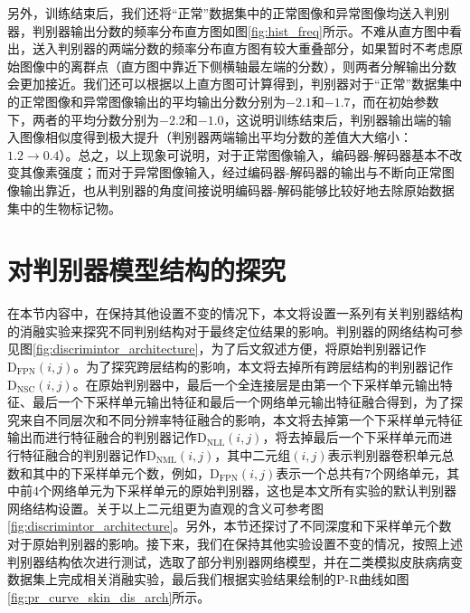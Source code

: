 \noindent 另外，训练结束后，我们还将“正常”数据集中的正常图像和异常图像均送入判别器，判别器输出分数的频率分布直方图如图\ref{fig:hist_freq}所示。不难从直方图中看出，送入判别器的两端分数的频率分布直方图有较大重叠部分，如果暂时不考虑原始图像中的离群点（直方图中靠近下侧横轴最左端的分数），则两者分解输出分数会更加接近。我们还可以根据以上直方图可计算得到，判别器对于“正常”数据集中的正常图像和异常图像输出的平均输出分数分别为$-2.1$和$-1.7$，而在初始参数下，两者的平均分数分别为$-2.2$和$-1.0$，这说明训练结束后，判别器输出端的输入图像相似度得到极大提升（判别器两端输出平均分数的差值大大缩小：$1.2\rightarrow 0.4$）。总之，以上现象可说明，对于正常图像输入，编码器-解码器基本不改变其像素强度；而对于异常图像输入，经过编码器-解码器的输出与不断向正常图像输出靠近，也从判别器的角度间接说明编码器-解码能够比较好地去除原始数据集中的生物标记物。


\section{对判别器模型结构的探究}\label{sec:dis_arch}
在本节内容中，在保持其他设置不变的情况下，本文将设置一系列有关判别器结构的消融实验来探究不同判别结构对于最终定位结果的影响。判别器的网络结构可参见图\ref{fig:discrimintor_architecture}，为了后文叙述方便，将原始判别器记作$\mathrm{D}_\mathrm{FPN}(i,j)$。为了探究跨层结构的影响，本文将去掉所有跨层结构的判别器记作$\mathrm{D}_\mathrm{NSC}(i,j)$。在原始判别器中，最后一个全连接层是由第一个下采样单元输出特征、最后一个下采样单元输出特征和最后一个网络单元输出特征融合得到，为了探究来自不同层次和不同分辨率特征融合的影响，本文将去掉第一个下采样单元特征输出而进行特征融合的判别器记作$\mathrm{D}_\mathrm{NLL}(i,j)$，将去掉最后一个下采样单元而进行特征融合的判别器记作$\mathrm{D}_\mathrm{NML}(i,j)$，其中二元组$(i,j)$表示判别器卷积单元总数和其中的下采样单元个数，例如，$\mathrm{D}_\mathrm{FPN}(i,j)$表示一个总共有$7$个网络单元，其中前$4$个网络单元为下采样单元的原始判别器，这也是本文所有实验的默认判别器网络结构设置。关于以上二元组更为直观的含义可参考图\ref{fig:discrimintor_architecture}。另外，本节还探讨了不同深度和下采样单元个数对于原始判别器的影响。接下来，我们在保持其他实验设置不变的情况，按照上述判别器结构依次进行测试，选取了部分判别器网络模型，并在二类模拟皮肤病病变数据集上完成相关消融实验，最后我们根据实验结果绘制的P-R曲线如图\ref{fig:pr_curve_skin_dis_arch}所示。

